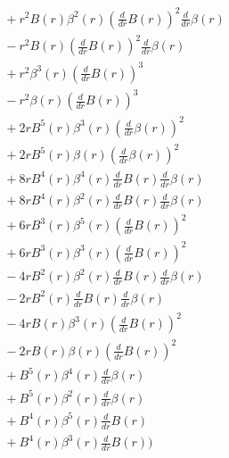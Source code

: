 \documentclass[11pt,a4paper]{article}
\begin{document}
\begin{align*}
  &\quad + r^{2} B{\left(r \right)} \beta^{2}{\left(r \right)} \left(\frac{d}{d r} B{\left(r \right)}\right)^{2} \frac{d}{d r} \beta{\left(r \right)} \\
  &\quad - r^{2} B{\left(r \right)} \left(\frac{d}{d r} B{\left(r \right)}\right)^{2} \frac{d}{d r} \beta{\left(r \right)} \\
  &\quad + r^{2} \beta^{3}{\left(r \right)} \left(\frac{d}{d r} B{\left(r \right)}\right)^{3} \\
  &\quad - r^{2} \beta{\left(r \right)} \left(\frac{d}{d r} B{\left(r \right)}\right)^{3} \\
  &\quad + 2 r B^{5}{\left(r \right)} \beta^{3}{\left(r \right)} \left(\frac{d}{d r} \beta{\left(r \right)}\right)^{2} \\
  &\quad + 2 r B^{5}{\left(r \right)} \beta{\left(r \right)} \left(\frac{d}{d r} \beta{\left(r \right)}\right)^{2} \\
  &\quad + 8 r B^{4}{\left(r \right)} \beta^{4}{\left(r \right)} \frac{d}{d r} B{\left(r \right)} \frac{d}{d r} \beta{\left(r \right)} \\
  &\quad + 8 r B^{4}{\left(r \right)} \beta^{2}{\left(r \right)} \frac{d}{d r} B{\left(r \right)} \frac{d}{d r} \beta{\left(r \right)} \\
  &\quad + 6 r B^{3}{\left(r \right)} \beta^{5}{\left(r \right)} \left(\frac{d}{d r} B{\left(r \right)}\right)^{2} \\
  &\quad + 6 r B^{3}{\left(r \right)} \beta^{3}{\left(r \right)} \left(\frac{d}{d r} B{\left(r \right)}\right)^{2} \\
  &\quad - 4 r B^{2}{\left(r \right)} \beta^{2}{\left(r \right)} \frac{d}{d r} B{\left(r \right)} \frac{d}{d r} \beta{\left(r \right)} \\
  &\quad - 2 r B^{2}{\left(r \right)} \frac{d}{d r} B{\left(r \right)} \frac{d}{d r} \beta{\left(r \right)} \\
  &\quad - 4 r B{\left(r \right)} \beta^{3}{\left(r \right)} \left(\frac{d}{d r} B{\left(r \right)}\right)^{2} \\
  &\quad - 2 r B{\left(r \right)} \beta{\left(r \right)} \left(\frac{d}{d r} B{\left(r \right)}\right)^{2} \\
  &\quad + B^{5}{\left(r \right)} \beta^{4}{\left(r \right)} \frac{d}{d r} \beta{\left(r \right)} \\
  &\quad + B^{5}{\left(r \right)} \beta^{2}{\left(r \right)} \frac{d}{d r} \beta{\left(r \right)} \\
  &\quad + B^{4}{\left(r \right)} \beta^{5}{\left(r \right)} \frac{d}{d r} B{\left(r \right)} \\
  &\quad + B^{4}{\left(r \right)} \beta^{3}{\left(r \right)} \frac{d}{d r} B{\left(r \right)}\Bigr)
\end{align*}
\end{document}
